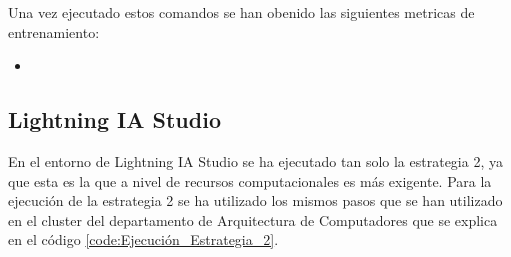 Una vez ejecutado estos comandos se han obenido las siguientes metricas de entrenamiento:

\begin{itemize}
    \item 
\end{itemize}

\subsection{Lightning IA Studio}
\label{subsec:lightning_ia_studio_ejecucion}

En el entorno de Lightning IA Studio se ha ejecutado tan solo la estrategia 2, ya que
esta es la que a nivel de recursos computacionales es más exigente. Para la ejecución
de la estrategia 2 se ha utilizado los mismos pasos que se han utilizado en el cluster
del departamento de Arquitectura de Computadores que se explica en el código \ref{code:Ejecución_Estrategia_2}.



